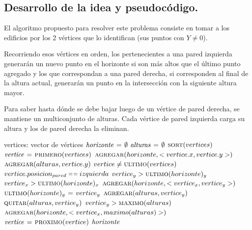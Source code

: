 \newpage


\subsection{Desarrollo de la idea y pseudocódigo.}

\vspace*{0.3cm}

El algoritmo propuesto para resolver este problema consiste en tomar a los edificios
por los 2 vértices que lo identifican (sus puntos con $Y \neq 0$).

Recorriendo esos vértices en orden, los pertenecientes a una pared izquierda
generarán un nuevo punto en el horizonte si son más altos que el último punto agregado
y los que correspondan a una pared derecha, si corresponden al final de la
altura actual, generarán un punto en la intersección con la siguiente altura mayor.

Para saber hasta dónde se debe bajar luego de un vértice de pared derecha, se
mantiene un multiconjunto de alturas. Cada vértice de pared izquierda carga su
altura y los de pared derecha la eliminan.

\begin{codebox}
\li \Comment vertices: vector de vértices
\li $\id{horizonte} \gets \emptyset$
\li $\id{alturas} \gets \emptyset$
\li $\textnormal{\scshape sort}(vertices)$
\li $\id{vertice} \gets \proc{primero}(vertices)$
\li $\textnormal{\scshape agregar}(horizonte, <vertice.x, vertice.y>)$
\li $\textnormal{\scshape agregar}(alturas, vertice.y)$
\li \While $vertice \neq \textnormal{\scshape ultimo}(vertices)$
      \Do
\li     \If $vertice.posicion_{pared} \isequal izquierda$
          \Then
\li         \If $vertice_y > \textnormal{\scshape ultimo}(horizonte)_y$
              \Then
\li             \If $vertice_x > \textnormal{\scshape ultimo}(horizonte)_x$
                  \Then
\li                 $\textnormal{\scshape agregar}(horizonte, <vertice_x, vertice_y>)$
\li               \Else
\li                 $\textnormal{\scshape ultimo}(horizonte)_y \mathrel{\hspace{1pt}=\hspace{1pt}} vertice_y$
                 \End
              \End
\li         $\textnormal{\scshape agregar}(alturas, vertice_y)$
\li       \Else
\li         $\textnormal{\scshape quitar}(alturas, vertice_y)$
\li         \If $vertice_y > \textnormal{\scshape maximo}(alturas)$
              \Then
\li             $\textnormal{\scshape agregar}(horizonte, <vertice_x, maximo(alturas)>)$
              \End
          \End
\li     $\id{vertice} \gets \proc{proximo}(vertice)$
      \End
\li \Return $\id{horizonte}$
\end{codebox}




